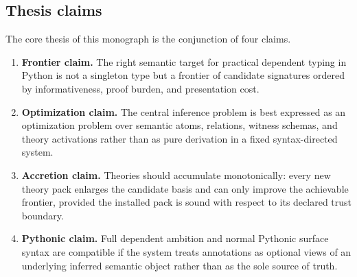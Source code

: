 \documentclass[11pt]{article}
\theoremstyle{definition}
\theoremstyle{plain}
\begin{document}
\subsection{Thesis claims}
The core thesis of this monograph is the conjunction of four claims.
\begin{enumerate}[label=\arabic*.]
  \item \textbf{Frontier claim.} The right semantic target for practical
  dependent typing in Python is not a singleton type but a frontier of
  candidate signatures ordered by informativeness, proof burden, and
  presentation cost.
  \item \textbf{Optimization claim.} The central inference problem is best
  expressed as an optimization problem over semantic atoms, relations, witness
  schemas, and theory activations rather than as pure derivation in a fixed
  syntax-directed system.
  \item \textbf{Accretion claim.} Theories should accumulate monotonically:
  every new theory pack enlarges the candidate basis and can only improve the
  achievable frontier, provided the installed pack is sound with respect to its
  declared trust boundary.
  \item \textbf{Pythonic claim.} Full dependent ambition and normal Pythonic
  surface syntax are compatible if the system treats annotations as optional
  views of an underlying inferred semantic object rather than as the sole source
  of truth.
\end{enumerate}
\end{document}
